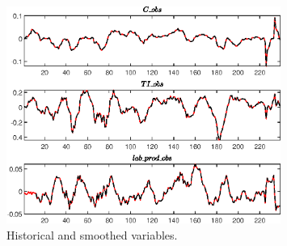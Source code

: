  
\begin{figure}[H]
\centering 
\includegraphics[width=0.80\textwidth]{directed_search_est_alt_obs/graphs/directed_search_est_alt_obs_HistoricalAndSmoothedVariables1}
\caption{Historical and smoothed variables.}\label{Fig:HistoricalAndSmoothedVariables:1}
\end{figure}


